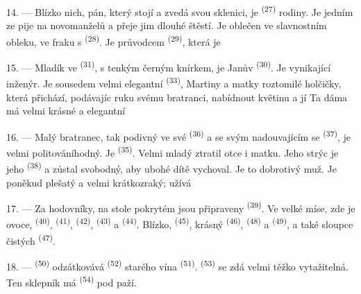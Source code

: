 14. --- Blízko nich, pán, který stojí a zvedá svou sklenici, je 
\textsuperscript{(27)} rodiny. Je jedním ze 
 pije na  novomanželů a přeje jim dlouhé štěstí. Je
oblečen ve slavnostním obleku, ve fraku s 
\textsuperscript{(28)}. Je průvodcem  \textsuperscript{(29)}, která je

15. --- Mladík ve  \textsuperscript{(31)}, s tenkým černým knírkem, je
Janův  \textsuperscript{(30)}. Je vynikající inženýr. Je sousedem velmi
elegantní  \textsuperscript{(33)}, Martiny  a
matky roztomilé holčičky, která přichází, podávajíc ruku svému bratranci, nabídnout
květinu a  jí  Ta dáma má velmi krásné
 a elegantní 

16. --- Malý bratranec, tak podivný ve své  \textsuperscript{(36)} a
se svým nadouvajícím se  \textsuperscript{(37)}, je velmi politováníhodný.
Je  \textsuperscript{(35)}. Velmi mladý ztratil otce i matku. Jeho
strýc je jeho  \textsuperscript{(38)} a zůstal svobodný, aby ubohé
dítě vychoval. Je to dobrotivý muž. Je poněkud plešatý a velmi krátkozraký; užívá

\VUsaut{2.4mm}
\VUsaut{3.0mm}

17. --- Za hodovníky, na stole pokrytém  jsou připraveny
 \textsuperscript{(39)}. Ve velké míse, zde je ovoce,
 \textsuperscript{(40)},  \textsuperscript{(41)},
 \textsuperscript{(42)},  \textsuperscript{(43)} a
 \textsuperscript{(44)}. Blízko, 
\textsuperscript{(45)}, krásný  \textsuperscript{(46)},  \textsuperscript{(48)} a  \textsuperscript{(49)}, a také
sloupce čistých  \textsuperscript{(47)}.

18. ---  \textsuperscript{(50)} odzátkovává 
\textsuperscript{(52)} starého vína  \textsuperscript{(51)}.
 \textsuperscript{(53)} se zdá velmi těžko vytažitelná. Ten
sklepník má  \textsuperscript{(54)} pod paží.

